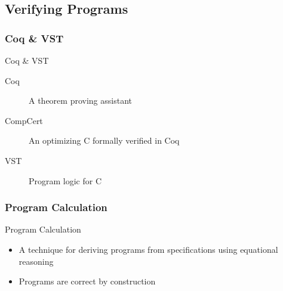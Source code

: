 \documentclass{beamer}
\begin{document}
  \subsection{Verifying Programs}
  \tableofcontents[
    sectionstyle=show/shaded,
    subsectionstyle=show/shaded,
    subsubsectionstyle=show/show/hide/hide,
  ]

  \subsubsection{Coq \& VST}
  \begin{frame}{Coq \& VST}
    \begin{description}
      \item[Coq] A theorem proving assistant
      \item[CompCert] An optimizing C formally verified in Coq
      \item[VST] Program logic for C
    \end{description}
  \end{frame}

  \subsubsection{Program Calculation}
  \begin{frame}{Program Calculation}
    \begin{itemize}
    \item<+-> A technique for deriving programs from specifications using
      \alert{equational reasoning}
    \item<+-> Programs are \alert{correct by construction}
    \end{itemize}
  \end{frame}
\end{document}
